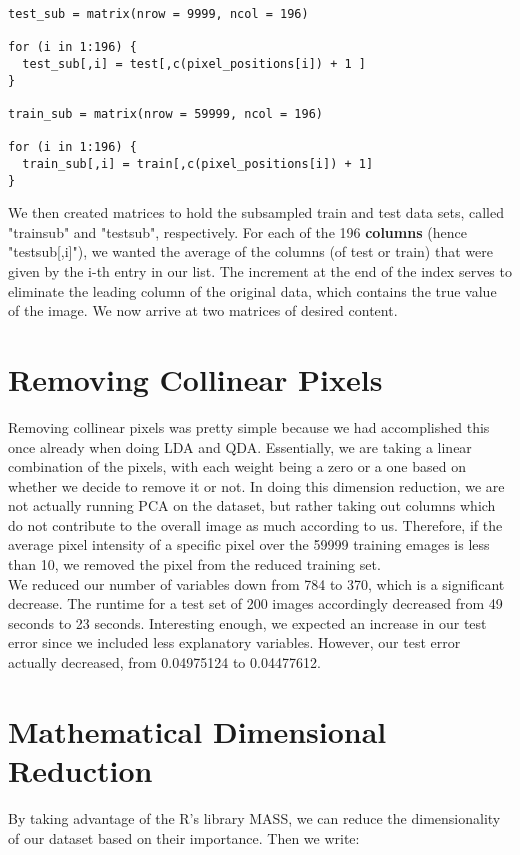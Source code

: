 \documentclass[10pt]{extarticle}
\begin{document}
\begin{verbatim}
test_sub = matrix(nrow = 9999, ncol = 196)

for (i in 1:196) {
  test_sub[,i] = test[,c(pixel_positions[i]) + 1 ]
}

train_sub = matrix(nrow = 59999, ncol = 196)

for (i in 1:196) {
  train_sub[,i] = train[,c(pixel_positions[i]) + 1]
}
\end{verbatim}

We then created matrices to hold the subsampled train and test data sets, called "train\textunderscore sub" and "test\textunderscore sub", respectively. For each of the 196 \textbf{columns} (hence "test\textunderscore sub[,i]"), we wanted the average of the columns (of test or train) that were given by the i-th entry in our list. The increment at the end of the index serves to eliminate the leading column of the original data, which contains the true value of the image. We now arrive at two matrices of desired content. 


\section{Removing Collinear Pixels}
\blank

Removing collinear pixels was pretty simple because we had accomplished this once already when doing LDA and QDA. Essentially, we are taking a linear combination of the pixels, with each weight being a zero or a one based on whether we decide to remove it or not. In doing this dimension reduction, we are not actually running PCA on the dataset, but rather taking out columns which do not contribute to the overall image as much according to us. Therefore, if the average pixel intensity of a specific pixel over the 59999 training emages is less than 10, we removed the pixel from the reduced training set.\\

We reduced our number of variables down from 784 to 370, which is a significant decrease. The runtime for a test set of 200 images accordingly decreased from 49 seconds to 23 seconds. Interesting enough, we expected an increase in our test error since we included less explanatory variables. However, our test error actually decreased, from 0.04975124 to 0.04477612.

\section{Mathematical Dimensional Reduction}
\blank
By taking advantage of the R's library MASS, we can reduce the dimensionality of our dataset based on their importance. Then we write:
\end{document}
